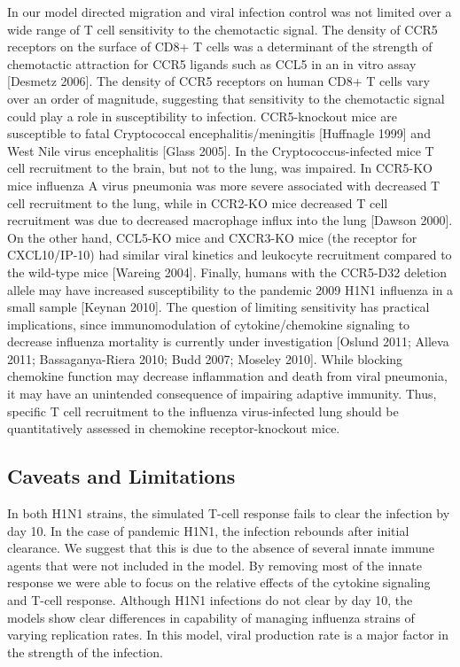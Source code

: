 \documentclass[10pt]{article}
\begin{document}
In our model directed migration and viral infection control was not limited over a wide range of T cell sensitivity to the chemotactic signal.  The density of CCR5 receptors on the surface of CD8+ T cells was a determinant of the strength of chemotactic attraction for CCR5 ligands such as CCL5 in an in vitro assay [Desmetz 2006].   The density of CCR5 receptors on human CD8+ T cells vary over an order of magnitude, suggesting that sensitivity to the chemotactic signal could play a role in susceptibility to infection.  CCR5-knockout mice are susceptible to fatal Cryptococcal encephalitis/meningitis [Huffnagle 1999] and West Nile virus encephalitis [Glass 2005].  In the Cryptococcus-infected mice T cell recruitment to the brain, but not to the lung, was impaired.   In CCR5-KO mice influenza A virus pneumonia was more severe associated with decreased T cell recruitment to the lung, while in CCR2-KO mice decreased T cell recruitment was due to decreased macrophage influx into the lung [Dawson 2000].  On the other hand, CCL5-KO mice and CXCR3-KO mice (the receptor for CXCL10/IP-10) had similar viral kinetics and leukocyte recruitment compared to the wild-type mice [Wareing 2004].  Finally, humans with the CCR5-D32 deletion allele may have increased susceptibility to the pandemic 2009 H1N1 influenza in a small sample [Keynan 2010].  The question of limiting sensitivity has practical implications, since immunomodulation of cytokine/chemokine signaling to decrease influenza mortality is currently under investigation [Oslund 2011; Alleva 2011; Bassaganya-Riera 2010; Budd 2007; Moseley 2010].  While blocking chemokine function may decrease inflammation and death from viral pneumonia, it may have an unintended consequence of impairing adaptive immunity.  Thus, specific T cell recruitment to the influenza virus-infected lung should be quantitatively assessed in chemokine receptor-knockout mice.

\subsection*{Caveats and Limitations}

In both H1N1 strains, the simulated T-cell response fails to clear the infection by day 10.  In the case of pandemic H1N1, the infection rebounds after initial clearance.  We suggest that this is due to the absence of several innate immune agents that were not included in the model.  By removing most of the innate response we were able to focus on the relative effects of the cytokine signaling and T-cell response.  Although H1N1 infections do not clear by day 10, the models show clear differences in capability of managing influenza strains of varying replication rates.  In this model, viral production rate is a major factor in the strength of the infection.
\end{document}
